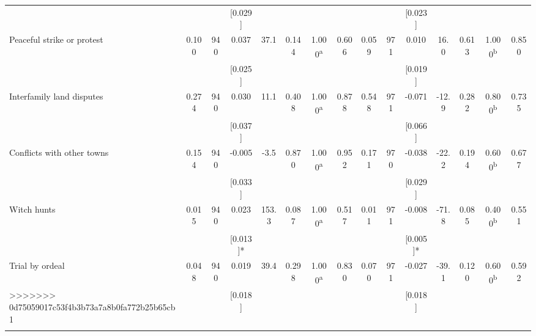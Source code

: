 \begin{tabular}{lcccccccccccccc}
 &  &  & [0.029] &  &  &  &  &  &  & [0.023] &  &  &  & \\
\quad Peaceful strike or protest & 0.100 & 940 & 0.037 & 37.1 & 0.144 & 1.000\textsuperscript{a} & 0.606 & 0.059 & 971 & 0.010 & 16.0 & 0.613 & 1.000\textsuperscript{b} & 0.850\\
 &  &  & [0.025] &  &  &  &  &  &  & [0.019] &  &  &  & \\
\quad Interfamily land disputes & 0.274 & 940 & 0.030 & 11.1 & 0.408 & 1.000\textsuperscript{a} & 0.878 & 0.548 & 971 & -0.071 & -12.9 & 0.282 & 0.800\textsuperscript{b} & 0.735\\
 &  &  & [0.037] &  &  &  &  &  &  & [0.066] &  &  &  & \\
\quad Conflicts with other towns & 0.154 & 940 & -0.005 & -3.5 & 0.870 & 1.000\textsuperscript{a} & 0.952 & 0.171 & 970 & -0.038 & -22.2 & 0.194 & 0.600\textsuperscript{b} & 0.677\\
 &  &  & [0.033] &  &  &  &  &  &  & [0.029] &  &  &  & \\
\quad Witch hunts & 0.015 & 940 & 0.023 & 153.3 & 0.087 & 1.000\textsuperscript{a} & 0.517 & 0.011 & 971 & -0.008 & -71.8 & 0.085 & 0.400\textsuperscript{b} & 0.551\\
 &  &  & [0.013]* &  &  &  &  &  &  & [0.005]* &  &  &  & \\
\quad Trial by ordeal & 0.048 & 940 & 0.019 & 39.4 & 0.298 & 1.000\textsuperscript{a} & 0.830 & 0.070 & 971 & -0.027 & -39.1 & 0.120 & 0.600\textsuperscript{b} & 0.592\\
>>>>>>> 0d75059017c53f4b3b73a7a8b0fa772b25b65cb1
 &  &  & [0.018] &  &  &  &  &  &  & [0.018] &  &  &  & \\
\noalign{\smallskip}\hline\end{tabular}
